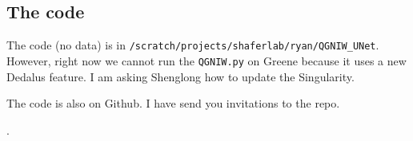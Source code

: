\subsection{The code}
The code (no data) is in \verb|/scratch/projects/shaferlab/ryan/QGNIW_UNet|. However, right now we cannot run the \verb|QGNIW.py| on Greene because it uses a new Dedalus feature. I am asking Shenglong how to update the Singularity. 

The code is also on Github. I have send you invitations to the repo.



\cite{Conn_2023}.